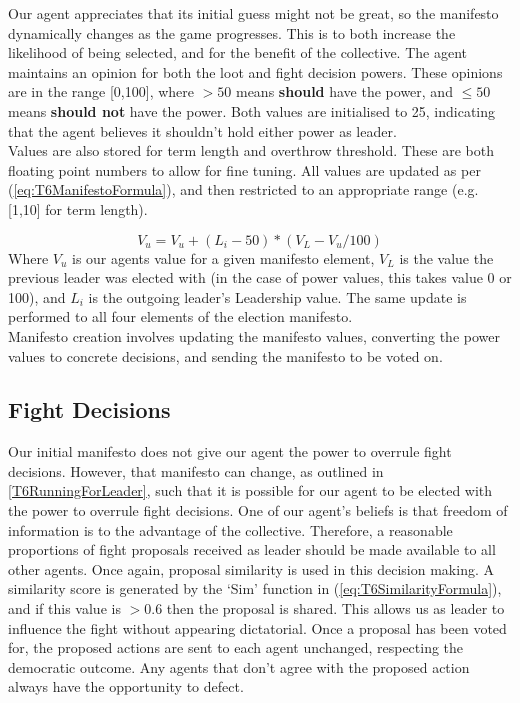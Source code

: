 Our agent appreciates that its initial guess might not be great, so the manifesto dynamically changes as the game progresses. This is to both increase the likelihood of being selected, and for the benefit of the collective. The agent maintains an opinion for both the loot and fight decision powers. These opinions are in the range [0,100], where $>50$ means \textbf{should} have the power, and $\leq 50$ means \textbf{should not} have the power. Both values are initialised to 25, indicating that the agent believes it shouldn't hold either power as leader.\\

Values are also stored for term length and overthrow threshold. These are both floating point numbers to allow for fine tuning. All values are updated as per (\ref{eq:T6ManifestoFormula}), and then restricted to an appropriate range (e.g. [1,10] for term length).

\begin{equation}\label{eq:T6ManifestoFormula}
    V_{u} = V_{u} + (L_{i}-50)*(V_{L}-V_{u}/100)
\end{equation}
Where $V_{u}$ is our agents value for a given manifesto element, $V_{L}$ is the value the previous leader was elected with (in the case of power values, this takes value 0 or 100), and $L_{i}$ is the outgoing leader's Leadership value. The same update is performed to all four elements of the election manifesto.\\

Manifesto creation involves updating the manifesto values, converting the power values to concrete decisions, and sending the manifesto to be voted on.

\subsection{Fight Decisions}

Our initial manifesto does not give our agent the power to overrule fight decisions. However, that manifesto can change, as outlined in \ref{T6RunningForLeader}, such that it is possible for our agent to be elected with the power to overrule fight decisions. One of our agent's beliefs is that freedom of information is to the advantage of the collective. Therefore, a reasonable proportions of fight proposals received as leader should be made available to all other agents. Once again, proposal similarity is used in this decision making. A similarity score is generated by the `Sim' function in (\ref{eq:T6SimilarityFormula}), and if this value is $>0.6$ then the proposal is shared. This allows us as leader to influence the fight without appearing dictatorial. Once a proposal has been voted for, the proposed actions are sent to each agent unchanged, respecting the democratic outcome. Any agents that don't agree with the proposed action always have the opportunity to defect.

